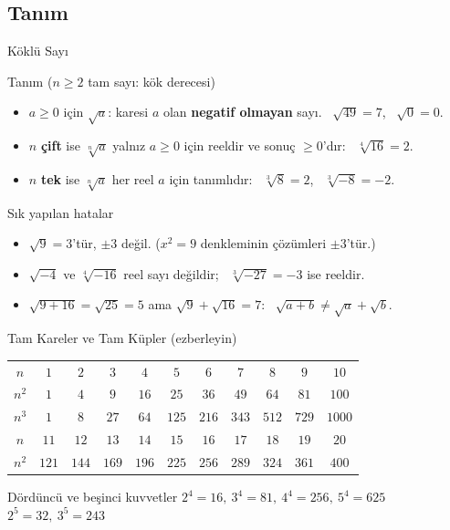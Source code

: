 \documentclass[aspectratio=169,11pt]{beamer}
\begin{document}
\subsection{Tanım}
\begin{frame}{Köklü Sayı}
\begin{block}{Tanım (\(n\ge 2\) tam sayı: kök derecesi)}
\begin{itemize}
\item \(a\ge 0\) için \(\sqrt{a}\): karesi \(a\) olan \textbf{negatif olmayan} sayı. \ \(\sqrt{49}=7\), \ \(\sqrt{0}=0\).
\item \(n\) \textbf{çift} ise \(\sqrt[n]{a}\) yalnız \(a\ge 0\) için reeldir ve sonuç \(\ge 0\)'dır: \ \(\sqrt[4]{16}=2\).
\item \(n\) \textbf{tek} ise \(\sqrt[n]{a}\) her reel \(a\) için tanımlıdır: \ \(\sqrt[3]{8}=2\), \ \(\sqrt[3]{-8}=-2\).
\end{itemize}
\end{block}
\begin{alertblock}{Sık yapılan hatalar}
\begin{itemize}
\item \(\sqrt{9}=3\)'tür, \(\pm 3\) değil. (\(x^2=9\) denkleminin çözümleri \(\pm 3\)'tür.)
\item \(\sqrt{-4}\) ve \(\sqrt[4]{-16}\) reel sayı değildir; \ \(\sqrt[3]{-27}=-3\) ise reeldir.
\item \(\sqrt{9+16}=\sqrt{25}=5\) ama \(\sqrt{9}+\sqrt{16}=7\): \ \(\sqrt{a+b}\neq\sqrt{a}+\sqrt{b}\).
\end{itemize}
\end{alertblock}
\end{frame}

\begin{frame}{Tam Kareler ve Tam Küpler (ezberleyin)}
\begin{center}
\renewcommand{\arraystretch}{1.25}
\begin{tabular}{c|cccccccccc}
\toprule
\(n\) & \(1\) & \(2\) & \(3\) & \(4\) & \(5\) & \(6\) & \(7\) & \(8\) & \(9\) & \(10\)\\
\(n^2\) & \(1\) & \(4\) & \(9\) & \(16\) & \(25\) & \(36\) & \(49\) & \(64\) & \(81\) & \(100\)\\
\(n^3\) & \(1\) & \(8\) & \(27\) & \(64\) & \(125\) & \(216\) & \(343\) & \(512\) & \(729\) & \(1000\)\\\midrule
\(n\) & \(11\) & \(12\) & \(13\) & \(14\) & \(15\) & \(16\) & \(17\) & \(18\) & \(19\) & \(20\)\\
\(n^2\) & \(121\) & \(144\) & \(169\) & \(196\) & \(225\) & \(256\) & \(289\) & \(324\) & \(361\) & \(400\)\\\bottomrule
\end{tabular}
\end{center}
\begin{block}{Dördüncü ve beşinci kuvvetler}
\(2^4=16,\ 3^4=81,\ 4^4=256,\ 5^4=625\) \qquad \(2^5=32,\ 3^5=243\)
\end{block}
\end{frame}
\end{document}
